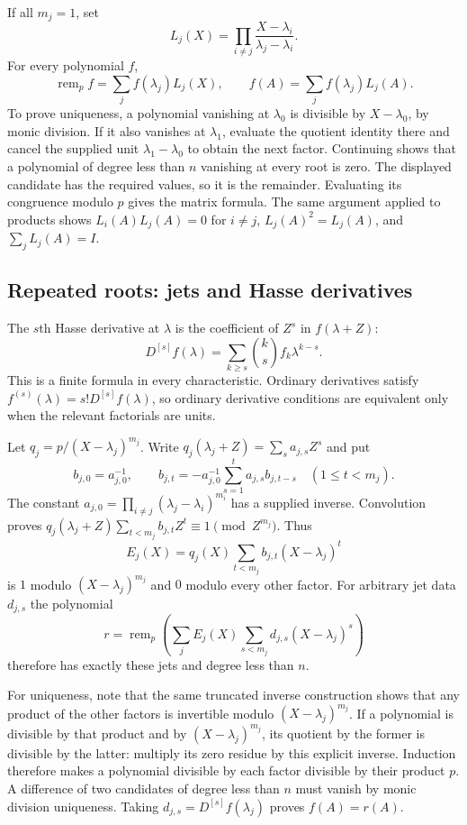 If all $m_j=1$, set
\[
 L_j(X)=\prod_{i\ne j}\frac{X-\lambda_i}{\lambda_j-\lambda_i}.
\]
For every polynomial $f$,
\[
 \operatorname{rem}_p f=\sum_j f(\lambda_j)L_j(X),\qquad
 f(A)=\sum_jf(\lambda_j)L_j(A).
\]
To prove uniqueness, a polynomial vanishing at $\lambda_0$ is divisible
by $X-\lambda_0$, by monic division. If it also vanishes at $\lambda_1$,
evaluate the quotient identity there and cancel the supplied unit
$\lambda_1-\lambda_0$ to obtain the next factor. Continuing shows that
a polynomial of degree less than $n$ vanishing at every root is zero.
The displayed candidate has the required values, so it is the
remainder. Evaluating its congruence modulo $p$ gives the matrix formula.
The same argument applied to products shows
$L_i(A)L_j(A)=0$ for $i\ne j$, $L_j(A)^2=L_j(A)$, and
$\sum_jL_j(A)=I$.

\subsection{Repeated roots: jets and Hasse derivatives}

The $s$th Hasse derivative at $\lambda$ is the coefficient of $Z^s$ in
$f(\lambda+Z)$:
\[
 D^{[s]}f(\lambda)=\sum_{k\geq s}\binom{k}{s}f_k\lambda^{k-s}.
\]
This is a finite formula in every characteristic. Ordinary derivatives
satisfy $f^{(s)}(\lambda)=s!D^{[s]}f(\lambda)$, so ordinary derivative
conditions are equivalent only when the relevant factorials are units.

Let $q_j=p/(X-\lambda_j)^{m_j}$. Write
$q_j(\lambda_j+Z)=\sum_s a_{j,s}Z^s$ and put
\[
 b_{j,0}=a_{j,0}^{-1},\qquad
 b_{j,t}=-a_{j,0}^{-1}\sum_{s=1}^t a_{j,s}b_{j,t-s}
 \quad(1\leq t<m_j).
\]
The constant $a_{j,0}=\prod_{i\ne j}(\lambda_j-\lambda_i)^{m_i}$
has a supplied inverse. Convolution proves
$q_j(\lambda_j+Z)\sum_{t<m_j}b_{j,t}Z^t\equiv1\pmod{Z^{m_j}}$.
Thus
\[
 E_j(X)=q_j(X)\sum_{t<m_j}b_{j,t}(X-\lambda_j)^t
\]
is $1$ modulo $(X-\lambda_j)^{m_j}$ and $0$ modulo every other factor.
For arbitrary jet data $d_{j,s}$ the polynomial
\[
 r=\operatorname{rem}_p\left(
 \sum_jE_j(X)\sum_{s<m_j}d_{j,s}(X-\lambda_j)^s\right)
\]
therefore has exactly these jets and degree less than $n$.

For uniqueness, note that the same truncated inverse construction shows
that any product of the other factors is invertible modulo
$(X-\lambda_j)^{m_j}$. If a polynomial is divisible by that product
and by $(X-\lambda_j)^{m_j}$, its quotient by the former is divisible by
the latter: multiply its zero residue by this explicit inverse.
Induction therefore makes a polynomial divisible by each factor
divisible by their product $p$. A difference of two candidates of
degree less than $n$ must vanish by monic division uniqueness.
Taking $d_{j,s}=D^{[s]}f(\lambda_j)$ proves $f(A)=r(A)$.

